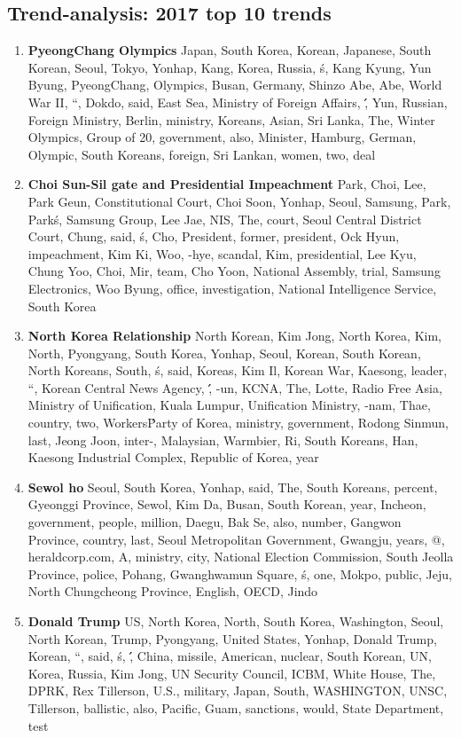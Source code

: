 \subsection{Trend-analysis: 2017 top 10 trends}
\begin{enumerate}
  \item \textbf{PyeongChang Olympics} Japan, South Korea, Korean, Japanese, South Korean, Seoul, Tokyo, Yonhap, Kang, Korea, Russia, \'s, Kang Kyung, Yun Byung, PyeongChang, Olympics, Busan, Germany, Shinzo Abe, Abe, World War II, ``, Dokdo, said, East Sea, Ministry of Foreign Affairs, \'\', Yun, Russian, Foreign Ministry, Berlin, ministry, Koreans, Asian, Sri Lanka, The, Winter Olympics, Group of 20, government, also, Minister, Hamburg, German, Olympic, South Koreans, foreign, Sri Lankan, women, two, deal
  \item \textbf{Choi Sun-Sil gate and Presidential Impeachment} Park, Choi, Lee, Park Geun, Constitutional Court, Choi Soon, Yonhap, Seoul, Samsung, Park, Park\'s, Samsung Group, Lee Jae, NIS, The, court, Seoul Central District Court, Chung, said, \'s, Cho, President, former, president, Ock Hyun, impeachment, Kim Ki, Woo, -hye, scandal, Kim, presidential, Lee Kyu, Chung Yoo, Choi, Mir, team, Cho Yoon, National Assembly, trial, Samsung Electronics, Woo Byung, office, investigation, National Intelligence Service, South Korea
  \item \textbf{North Korea Relationship} North Korean, Kim Jong, North Korea, Kim, North, Pyongyang, South Korea, Yonhap, Seoul, Korean, South Korean, North Koreans, South, \'s, said, Koreas, Kim Il, Korean War, Kaesong, leader, ``, Korean Central News Agency, \'\', -un, KCNA, The, Lotte, Radio Free Asia, Ministry of Unification, Kuala Lumpur, Unification Ministry, -nam, Thae, country, two, Workers\' Party of Korea, ministry, government, Rodong Sinmun, last, Jeong Joon, inter-, Malaysian, Warmbier, Ri, South Koreans, Han, Kaesong Industrial Complex, Republic of Korea, year
  \item \textbf{Sewol ho} Seoul, South Korea, Yonhap, said, The, South Koreans, percent, Gyeonggi Province, Sewol, Kim Da, Busan, South Korean, year, Incheon, government, people, million, Daegu, Bak Se, also, number, Gangwon Province, country, last, Seoul Metropolitan Government, Gwangju, years, @, heraldcorp.com, A, ministry, city, National Election Commission, South Jeolla Province, police, Pohang, Gwanghwamun Square, \'s, one, Mokpo, public, Jeju, North Chungcheong Province, English, OECD, Jindo
  \item \textbf{Donald Trump} US, North Korea, North, South Korea, Washington, Seoul, North Korean, Trump, Pyongyang, United States, Yonhap, Donald Trump, Korean, ``, said, \'s, \'\', China, missile, American, nuclear, South Korean, UN, Korea, Russia, Kim Jong, UN Security Council, ICBM, White House, The, DPRK, Rex Tillerson, U.S., military, Japan, South, WASHINGTON, UNSC, Tillerson, ballistic, also, Pacific, Guam, sanctions, would, State Department, test

\end{enumerate}
